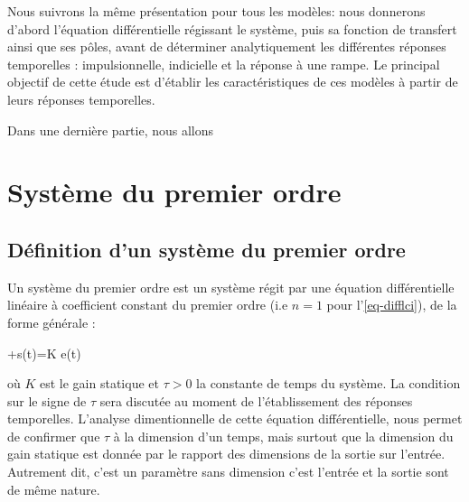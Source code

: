 Nous suivrons la même présentation pour tous les modèles: 
nous donnerons d'abord l'équation différentielle régissant le système, puis 
sa fonction de transfert ainsi que ses pôles, avant de 
déterminer analytiquement les différentes réponses temporelles : 
impulsionnelle, indicielle et la réponse à une rampe. 
Le principal objectif de cette étude est d'établir les caractéristiques 
de ces modèles à partir de leurs réponses temporelles.

Dans une dernière partie, nous allons     

\newpage
\section{Système du premier ordre}

\subsection{Définition d'un système du premier ordre}
Un système du premier ordre est un système régit par une équation
différentielle linéaire à coefficient constant du premier ordre 
(i.e $n=1$ pour l'\cref{eq-difflci}), de la forme générale :
\begin{bequation}
    \tau{}+s(t)=K e(t)\label{eq-1er}
\end{bequation}
où $K$ est le gain statique et $\tau>0$ la constante de 
temps du système. La condition sur le signe de $\tau$ sera 
discutée au moment de l'établissement des réponses temporelles.
L'analyse dimentionnelle de cette équation différentielle, nous permet 
de confirmer que $\tau$ à la dimension d'un temps, mais surtout que 
la dimension du gain statique est donnée par le rapport des dimensions de 
la sortie sur l'entrée. Autrement dit, c'est un paramètre sans dimension 
c'est l'entrée et la sortie sont de même nature.

